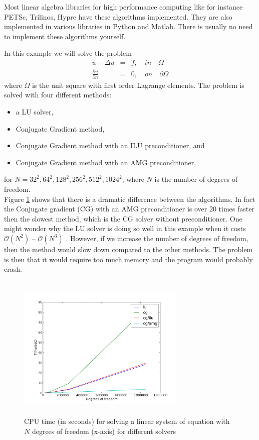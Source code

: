 Most linear algebra libraries for high performance computing like for instance PETSc, Trilinos, 
Hypre have these algorithms implemented. They are also implemented in various libraries
in Python and Matlab. There is usually no need to implement these algorithms yourself.     



\begin{example}
\label{example:CPU_time}
In this example we will solve the problem
\begin{eqnarray*}
u - \Delta u &=& f, \quad in\quad \Omega \\
\frac{\partial u}{\partial n} &=& 0, \quad on \quad \partial \Omega
\end{eqnarray*}
where $\Omega$ is the unit square with first order Lagrange elements.
The problem is solved with four different methods:
\begin{itemize}
\item a LU solver,
\item Conjugate Gradient method,
\item Conjugate Gradient method with an ILU preconditioner, and
\item Conjugate Gradient method with an AMG preconditioner,
\end{itemize}
for $N = 32^2, 64^2, 128^2, 256^2, 512^2, 1024^2$, where $N$ is the number of degrees of freedom. \\
Figure \ref{fig:CPU_time} shows that there is a dramatic difference between the algorithms. 
In fact the Conjugate gradient (CG) with an AMG preconditioner is over 20 times faster then the 
slowest method, which is the CG solver without preconditioner. One might wonder why the 
LU solver is doing so well in this example when it costs $\mathcal{O}(N^2)$ -- $\mathcal{O}(N^3)$ . 
However, if we increase the number of degrees of freedom, then the method would slow down compared 
to the other methods. The problem is then that it would require too much memory and the program 
would probably crash. 



\begin{figure}
\includegraphics[width=8cm, height=7cm]{chapters/iterative_methods/plots/cpu_time_comparison_plot.pdf}
\caption{CPU time (in seconds) for solving a linear system of equation with $N$ degrees of freedom (x-axis) 
             for different solvers} 
\label{fig:CPU_time}
\end{figure}


\end{example}
